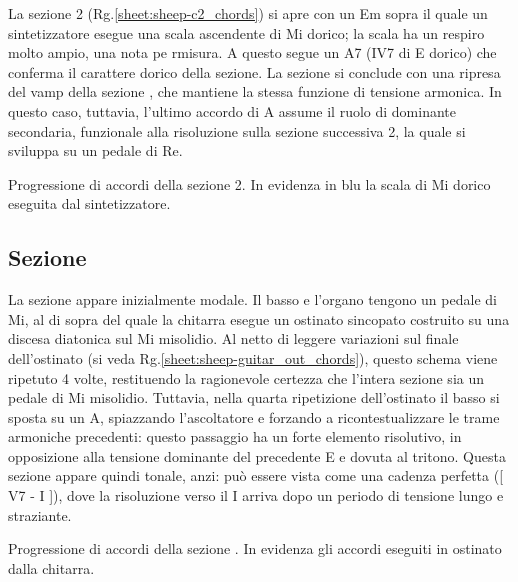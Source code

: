 \documentclass[class=book, crop=false, oneside, 12pt]{standalone}
\begin{document}
    La sezione 2 (Rg.\ref{sheet:sheep-c2_chords})  si apre con un Em  sopra il quale un sintetizzatore esegue una scala ascendente di Mi dorico; la scala ha un respiro molto ampio, una nota pe rmisura. A questo segue un A7 (IV7 di E dorico) che conferma il carattere dorico della sezione. La sezione si conclude con una ripresa del vamp della sezione , che mantiene la stessa funzione di tensione armonica. In questo caso, tuttavia, l'ultimo accordo di A assume il ruolo di dominante secondaria, funzionale alla risoluzione sulla sezione successiva 2, la quale si sviluppa su un pedale di Re.

    \begin{sheet}[htb]
        \centering
        \caption[Progressione di accordi della sezione 2.]{Progressione di accordi della sezione 2. In evidenza in blu la scala di Mi dorico eseguita dal sintetizzatore.}
        \label{sheet:sheep-c2_chords}
    \end{sheet}

    \subsection{Sezione }
    La sezione  appare inizialmente modale. Il basso e l'organo tengono un pedale di Mi, al di sopra del quale la chitarra esegue un ostinato sincopato costruito su una discesa diatonica sul Mi misolidio. Al netto di leggere variazioni sul finale dell'ostinato (si veda Rg.\ref{sheet:sheep-guitar_out_chords}), questo schema viene ripetuto 4 volte, restituendo la ragionevole certezza che l'intera sezione sia un pedale di Mi misolidio. Tuttavia, nella quarta ripetizione dell'ostinato il basso si sposta su un A, spiazzando l'ascoltatore e forzando a ricontestualizzare le trame armoniche precedenti: questo passaggio ha un forte elemento risolutivo, in opposizione alla tensione dominante del precedente E e dovuta al tritono. Questa sezione appare quindi tonale, anzi: può essere vista come una cadenza perfetta ([ V7 - I ]), dove la risoluzione verso il I arriva dopo un periodo di tensione lungo e straziante.

    
    \begin{sheet}[htb]
        \centering
        \caption{Progressione di accordi della sezione . In evidenza gli accordi eseguiti in ostinato dalla chitarra.}
        \label{sheet:sheep-guitar_out_chords}
    \end{sheet}
    
\end{document}
